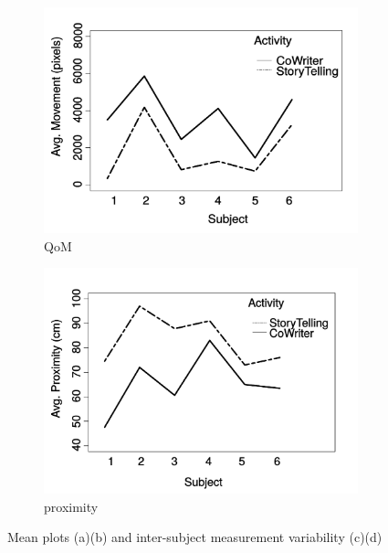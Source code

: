 \documentclass[a4paper, 10pt, conference]{ieeeconf}      %
\begin{document}
\begin{figure}
        \begin{subfigure}[b]{0.35\textwidth}
                \includegraphics[width=\textwidth]{../dissertation/figures/AvgMovement2.pdf}
                \caption{QoM}
                \label{fig:anovaMov}
        \end{subfigure}
        \begin{subfigure}[b]{0.35\textwidth}
                \includegraphics[width=\textwidth]{../dissertation/figures/AvgProximity2.pdf}
                \caption{proximity}
                \label{fig:anovaProx}
        \end{subfigure}
		\caption{Mean plots (a)(b) and inter-subject measurement variability (c)(d)}
\end{figure}
\end{document}
